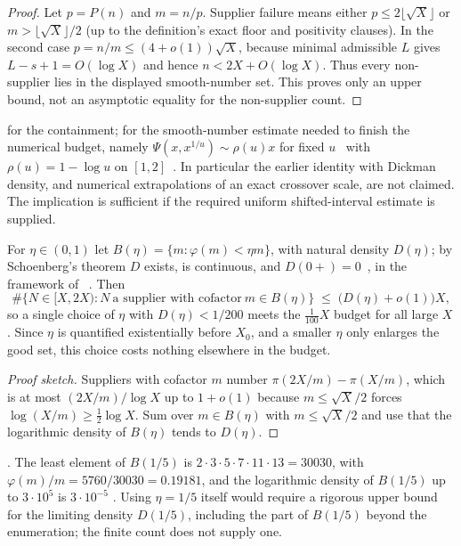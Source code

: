 \begin{proof}
Let $p=P(n)$ and $m=n/p$.  Supplier failure means either
$p\le2\lfloor\sqrt X\rfloor$ or $m>\lfloor\sqrt X\rfloor/2$ (up to the
definition's exact floor and positivity clauses).  In the second case
$p=n/m\le(4+o(1))\sqrt X$, because minimal admissible $L$ gives
$L-s+1=O(\log X)$ and hence $n<2X+O(\log X)$.  Thus every non-supplier lies in
the displayed smooth-number set.  This proves only an upper bound, not an
asymptotic equality for the non-supplier count.
\end{proof}

\noindent
{} for the containment;  for the smooth-number estimate
needed to finish the numerical budget, namely
$\Psi(x,x^{1/u})\sim\rho(u)x$ for fixed $u$~\cite[(1.1), p.~268]{granville-smooth}
with $\rho(u)=1-\log u$ on $[1,2]$~\cite[(1.3), p.~268]{granville-smooth}.  In particular the earlier identity
with Dickman density, and numerical extrapolations of an exact crossover
scale, are not claimed.  The implication is sufficient if the required
uniform shifted-interval estimate is supplied.

\begin{prop}\label{prop:badcof}
For $\eta\in(0,1)$ let $B(\eta)=\{m:\varphi(m)<\eta m\}$, with natural density
$D(\eta)$; by Schoenberg's theorem $D$ exists, is continuous, and
$D(0+)=0$~\cite[\S17, p.~193]{schoenberg1928}, in the framework
of~\cite[Theorem~1, pp.~318--319, and \S8, p.~323]{schoenberg1936} . Then
\[
  \#\{N\in[X,2X): N\ \text{a supplier with cofactor}\ m\in B(\eta)\}
  \;\le\;\bigl(D(\eta)+o(1)\bigr)X ,
\]
so a single choice of $\eta$ with $D(\eta)<1/200$ meets the $\tfrac{1}{100}X$
budget for all large $X$. Since $\eta$ is quantified existentially before
$X_0$, and a smaller $\eta$ only enlarges the good set, this choice costs
nothing elsewhere in the budget.
\end{prop}

\begin{proof}[Proof sketch]
Suppliers with cofactor $m$ number $\pi(2X/m)-\pi(X/m)$, which is at most
$(2X/m)/\log X$ up to $1+o(1)$ because $m\le\sqrt X/2$ forces
$\log(X/m)\ge\tfrac12\log X$. Sum over $m\in B(\eta)$ with $m\le\sqrt X/2$
and use that the logarithmic density of $B(\eta)$ tends to $D(\eta)$.
\end{proof}

\noindent
{} \quad {}. The least element of $B(1/5)$ is
$2\cdot3\cdot5\cdot7\cdot11\cdot13=30030$, with
$\varphi(m)/m=5760/30030=0.19181$, and the logarithmic density of $B(1/5)$ up
to $3\cdot10^{5}$ is $3\cdot 10^{-5}$ . Using $\eta=1/5$ itself would
require a rigorous upper bound for the limiting density $D(1/5)$, including
the part of $B(1/5)$ beyond the enumeration; the finite count does not supply
one.

